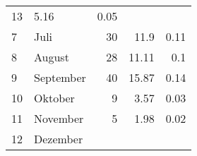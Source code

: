 \begin{longtable}{lXrrr}
       \num{13} &
       \num[round-mode=places,round-precision=2]{5,16} &
         \num[round-mode=places,round-precision=2]{0,05} \\

     7 &
     \multicolumn{1}{X}{ Juli   } &


       \num{30} &
       \num[round-mode=places,round-precision=2]{11,9} &
         \num[round-mode=places,round-precision=2]{0,11} \\

     8 &
     \multicolumn{1}{X}{ August   } &


       \num{28} &
       \num[round-mode=places,round-precision=2]{11,11} &
         \num[round-mode=places,round-precision=2]{0,1} \\

     9 &
     \multicolumn{1}{X}{ September   } &


       \num{40} &
       \num[round-mode=places,round-precision=2]{15,87} &
         \num[round-mode=places,round-precision=2]{0,14} \\

     10 &
     \multicolumn{1}{X}{ Oktober   } &


       \num{9} &
       \num[round-mode=places,round-precision=2]{3,57} &
         \num[round-mode=places,round-precision=2]{0,03} \\

     11 &
     \multicolumn{1}{X}{ November   } &


       \num{5} &
       \num[round-mode=places,round-precision=2]{1,98} &
         \num[round-mode=places,round-precision=2]{0,02} \\

     12 &
     \multicolumn{1}{X}{ Dezember   } &



\end{longtable}
